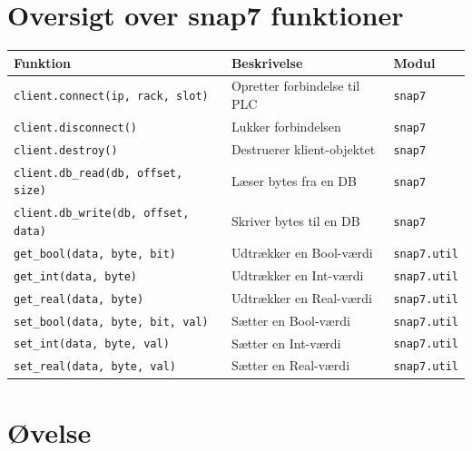 \documentclass[12pt, a4paper]{article}
\begin{document}
\section{Oversigt over snap7 funktioner}

\begin{center}
\begin{tabular}{lp{6cm}l}
\toprule
\textbf{Funktion} & \textbf{Beskrivelse} & \textbf{Modul} \\
\midrule
\texttt{client.connect(ip, rack, slot)} & Opretter forbindelse til PLC & \texttt{snap7} \\
\texttt{client.disconnect()} & Lukker forbindelsen & \texttt{snap7} \\
\texttt{client.destroy()} & Destruerer klient-objektet & \texttt{snap7} \\
\texttt{client.db\_read(db, offset, size)} & Læser bytes fra en DB & \texttt{snap7} \\
\texttt{client.db\_write(db, offset, data)} & Skriver bytes til en DB & \texttt{snap7} \\
\texttt{get\_bool(data, byte, bit)} & Udtrækker en Bool-værdi & \texttt{snap7.util} \\
\texttt{get\_int(data, byte)} & Udtrækker en Int-værdi & \texttt{snap7.util} \\
\texttt{get\_real(data, byte)} & Udtrækker en Real-værdi & \texttt{snap7.util} \\
\texttt{set\_bool(data, byte, bit, val)} & Sætter en Bool-værdi & \texttt{snap7.util} \\
\texttt{set\_int(data, byte, val)} & Sætter en Int-værdi & \texttt{snap7.util} \\
\texttt{set\_real(data, byte, val)} & Sætter en Real-værdi & \texttt{snap7.util} \\
\bottomrule
\end{tabular}
\end{center}

\section{Øvelse}
\end{document}
